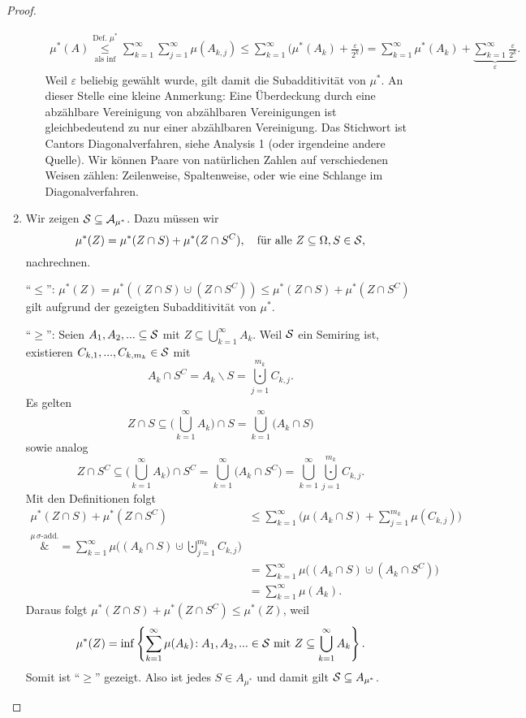\begin{proof}
\begin{enumerate}[label=(\alph*)]
\begin{itemize}
		\begin{gather*}
			\mu^{*}(A) \underset{\text{als } \inf}{\overset{\text{Def. } \mu^{*}}{\leq}} \sum\limits_{k= 1}^{\infty} \sum\limits_{j= 1}^{\infty} \mu(A_{k,j}) \leq \sum\limits_{k = 1}^{\infty} \Big( \mu^{*}(A_k) + \frac{\varepsilon}{2^k} \Big) = \sum\limits_{k = 1}^{\infty} \mu^{*}(A_k) + \underbrace{\sum_{k=1}^\infty \frac{\varepsilon}{2^k}}_{\varepsilon}.
		\end{gather*}
		Weil $\varepsilon$ beliebig gew\"ahlt wurde, gilt damit die Subadditivit\"at von $\mu^*$. An dieser Stelle eine kleine Anmerkung: Eine \"Uberdeckung durch eine abz\"ahlbare Vereinigung von abz\"ahlbaren Vereinigungen ist gleichbedeutend zu nur einer abz\"ahlbaren Vereinigung. Das Stichwort ist Cantors Diagonalverfahren, siehe Analysis 1 (oder irgendeine andere Quelle). Wir k\"onnen Paare von nat\"urlichen Zahlen auf verschiedenen Weisen z\"ahlen: Zeilenweise, Spaltenweise, oder wie eine Schlange im Diagonalverfahren.
	\end{itemize}
	\item 	
		Wir zeigen $\mathcal{S} \subseteq \mathcal{A}_{\mu^{*}}$. Dazu m\"ussen wir $$\mu^{*}(Z) = \mu^{*}(Z \cap S) + \mu^{*}(Z \cap S^C),\quad \text{für alle }Z \subseteq \Omega, S \in \mathcal{S},$$ nachrechnen.
		
		\enquote{$\leq$}: $\mu^{*}(Z) = \mu^{*}((Z \cap S )\cupdot (Z \cap S^C)) \leq \mu^{*}(Z \cap S) + \mu^{*}(Z \cap S^C)$ gilt aufgrund der gezeigten Subadditivit\"at von $\mu^*$.
		
		\enquote{$\geq$}: Seien $A_1,A_2,... \subseteq \mathcal{S}$ mit $Z \subseteq \bigcup\limits_{k= 1}^{\infty} A_k.$ Weil $\mathcal{S}$ ein Semiring ist, existieren $C_{k,1},..., C_{k,m_k} \in \mathcal{S}$ mit \[ A_k \cap S^C = A_k \backslash S = \bigcupdot\limits_{j= 1}^{m_k} C_{k,j}. \]
		Es gelten 
			 \[ Z \cap S \subseteq \Big(\bigcup\limits_{k = 1}^{\infty} A_k\Big) \cap S = \bigcup\limits_{k = 1}^{\infty} \big( A_k \cap S \big) \]
			 sowie analog
			 \[ Z \cap S^C \subseteq  \Big(\bigcup\limits_{k = 1}^{\infty} A_k\Big) \cap S^C= \bigcup\limits_{k = 1}^{\infty} \big( A_k \cap S^C \big)=\bigcup\limits_{k = 1}^{\infty}\bigcupdot\limits_{j= 1}^{m_k} C_{k,j}. \]
		Mit den Definitionen folgt
		\begin{align*}
			\mu^{*} (Z \cap S) + \mu^{*} (Z \cap S^C) 
			&\leq \sum\limits_{k=1}^{\infty} \Big(\mu( A_k\cap S) +\sum\limits_{j=1}^{m_k} \mu(C_{k,j})\Big )\\
			\overset{\mu\,\sigma\text{-add.}}&{=} \sum\limits_{k=1}^{\infty} \mu \Big((A_k \cap S) \cupdot \bigcupdot\limits_{j=1}^{m_k} C_{k,j} \Big)\\
			& = \sum\limits_{k=1}^{\infty} \mu \big((A_k \cap S )\cupdot( A_k \cap S^C)\big)\\
			&=\sum_{k=1}^\infty \mu(A_k).
		\end{align*}
		Daraus folgt $\mu^{*}(Z \cap S) + \mu^{*}(Z \cap S^C) \leq \mu^{*}(Z)$, weil \[\mu^{*}(Z) = \inf\left\{ \sum\limits_{k=1}^{\infty} \mu(A_k) \! : A_1,A_2,... \in \mathcal{S} \text{ mit } Z \subseteq \bigcup\limits_{k = 1}^{\infty} A_k \right\}.\] Somit ist \enquote{$\geq$} gezeigt.		
		Also ist jedes $S \in A_{\mu^{*}}$ und damit gilt $\mathcal{S} \subseteq A_{\mu^{*}}$.
		

\end{enumerate}
\end{proof}
